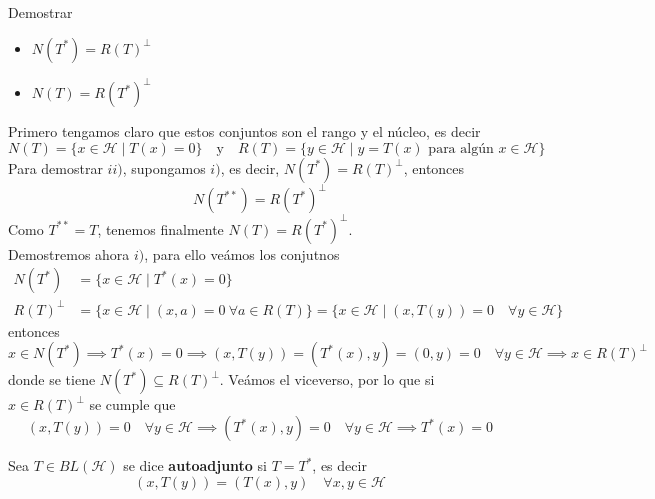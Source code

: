 \begin{ejercicio}
    Demostrar 
    \begin{itemize}
        \item[i)] $N(T^*) = R(T)^\perp$
        \item[ii)] $N(T) = R(T^*)^\perp$ \\
    \end{itemize}
    \noindent
    Primero tengamos claro que estos conjuntos son el rango y el núcleo, es decir
    \begin{equation*}
        N(T) = \{x \in \mathcal{H} \mid T(x) = 0\}\quad \text{y} \quad  R(T) = \{y \in \mathcal{H} \mid y = T(x) \text{ para algún } x \in \mathcal{H}\}
    \end{equation*}
    Para demostrar $ii)$, supongamos  $i)$, es decir, $N(T^*) = R(T)^\perp$, entonces 
    $$N(T^{**}) = R(T^*)^\perp$$
    Como $T^{**} = T$, tenemos finalmente $N(T) = R(T^*)^\perp$. \\

    \noindent
    Demostremos ahora $i)$, para ello veámos los conjutnos
    \begin{align*}
        N(T^*) &= \{x \in \mathcal{H} \mid T^*(x) = 0\} \\
        R(T)^\perp &= \{x \in \mathcal{H} \mid (x, a)=0 \ \forall a \in R(T)\}= \{x \in \mathcal{H} \mid (x, T(y)) = 0 \quad \forall y \in \mathcal{H}\}
    \end{align*}
    entonces
    $$x \in N(T^*) \implies T^*(x) = 0 \implies (x, T(y)) = (T^*(x), y) = (0,y)=0 \quad \forall y \in \mathcal{H} \implies x \in R(T)^\perp$$
    donde se tiene $N(T^*) \subseteq R(T)^\perp$. Veámos el viceverso, por lo que si $x \in R(T)^\perp$ se cumple que
    $$(x, T(y)) = 0 \quad \forall y \in \mathcal{H} \implies (T^*(x), y) = 0 \quad \forall y \in \mathcal{H} \implies T^*(x) = 0$$
\end{ejercicio}

\begin{definicion}
    Sea $T \in BL(\mathcal{H})$ se dice \textbf{autoadjunto} si $T = T^*$, es decir
    \[ (x, T(y)) = (T(x), y) \quad \forall x, y \in \mathcal{H} \]
\end{definicion}


